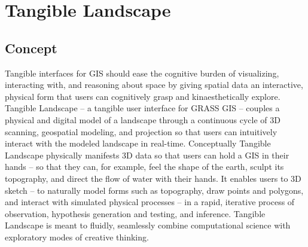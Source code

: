 \documentclass[prodmode,acmtochi]{acmsmall} %
\begin{document}
\section{Tangible Landscape}

\subsection{Concept}

% 
%
% 


Tangible interfaces for GIS 
should ease the cognitive burden of 
visualizing, interacting with, 
and reasoning about space
by giving spatial data an interactive, physical form 
that users can cognitively grasp and kinaesthetically explore. 
%
Tangible Landscape -- a tangible user interface for GRASS GIS --
couples a physical and digital model of a landscape through a continuous cycle of 3D scanning, geospatial modeling, and projection
so that users can intuitively interact with the modeled landscape in real-time.
%
Conceptually Tangible Landscape physically manifests 3D data 
so that users can hold a GIS in their hands -- 
so that they can, for example, feel the shape of the earth, sculpt its topography, and direct the flow of water with their hands.
%
It enables users to 3D sketch -- 
to naturally model forms such as topography, 
draw points and polygons, 
and interact with simulated physical processes -- 
in a rapid, iterative process 
of observation, hypothesis generation and testing, and inference. 
%
Tangible Landscape is meant to fluidly, seamlessly combine
computational science with exploratory modes of creative thinking.
\end{document}
